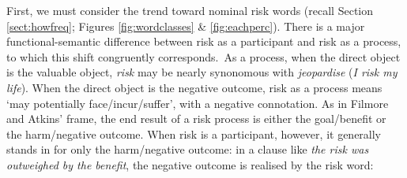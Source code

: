 First, we must consider the trend toward nominal risk words (recall Section \ref{sect:howfreq}; Figures \ref{fig:wordclasses} \& \ref{fig:eachperc}). There is a major functional-semantic difference between risk as a participant and risk as a process, to which this shift congruently corresponds.~As a process, when the direct object is the valuable object, \emph{risk} may be nearly synonomous with \emph{jeopardise} (\emph{I risk my life}). When the direct object is the negative outcome, risk as a process means `may potentially face\slash incur\slash suffer', with a negative connotation. As in Filmore and Atkins' frame, the end result of a risk process is either the goal\slash benefit or the harm\slash negative outcome. When risk is a participant, however, it generally stands in for only the harm\slash negative outcome: in a clause like \emph{the risk was outweighed by the benefit}, the negative outcome is realised by the risk word:

